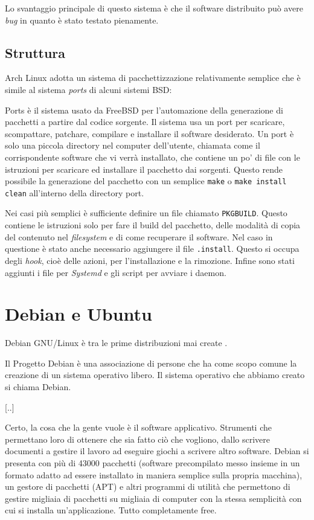 \documentclass[10pt,titlepage,twoside,a4paper]{report}
\begin{document}
Lo svantaggio principale di questo sistema è che il software distribuito 
può avere \emph{bug} in quanto è stato testato pienamente.

\subsection{Struttura}
Arch Linux adotta un sistema di pacchettizzazione relativamente semplice 
che è simile al sistema \emph{ports} di alcuni sistemi 
BSD\cite{portsLikeSystem}:
\begin{displayquote}
Ports è il sistema usato da FreeBSD per l'automazione della generazione di 
pacchetti a partire dal codice sorgente. Il sistema usa un port per scaricare, 
scompattare, patchare, compilare e installare il software desiderato. Un port 
è solo una piccola directory nel computer dell'utente, chiamata come il 
corrispondente software che vi verrà installato, che contiene un po' di file 
con le istruzioni per scaricare ed installare il pacchetto dai sorgenti. Questo 
rende possibile la generazione del pacchetto con un semplice \texttt{make} o 
\texttt{make install clean} all'interno della directory port.
\end{displayquote}

Nei casi più semplici è sufficiente definire un file chiamato 
\texttt{PKGBUILD}. Questo contiene le istruzioni solo per fare il build del 
pacchetto, delle modalità di copia del contenuto nel \emph{filesystem} e di 
come recuperare il software. Nel caso in questione è stato anche necessario 
aggiungere il file \texttt{.install}. Questo si occupa degli \emph{hook}, cioè 
delle azioni, per l'installazione e la rimozione. Infine sono stati aggiunti i 
file per \emph{Systemd} e gli script per avviare i daemon.


\section{Debian e Ubuntu}
Debian GNU/Linux è tra le prime distribuzioni mai 
create\cite{debianFirstDistro} \cite{debian}.
\begin{displayquote}
Il Progetto Debian è una associazione di persone che ha come scopo comune la 
creazione di un sistema operativo libero. Il sistema operativo che abbiamo 
creato si chiama Debian.

[..]

Certo, la cosa che la gente vuole è il software applicativo. Strumenti che 
permettano loro di ottenere che sia fatto ciò che vogliono, dallo scrivere 
documenti a gestire il lavoro ad eseguire giochi a scrivere altro software. 
Debian si presenta con più di 43000 pacchetti (software precompilato messo 
insieme in un formato adatto ad essere installato in maniera semplice sulla 
propria macchina), un gestore di pacchetti (APT) e altri programmi di utilità 
che permettono di gestire migliaia di pacchetti su migliaia di computer con la 
stessa semplicità con cui si installa un'applicazione. Tutto completamente 
free. 
\end{displayquote}
\end{document}
